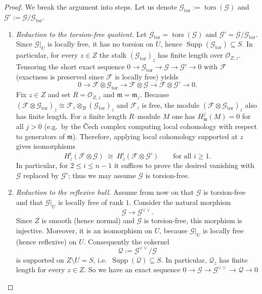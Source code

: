 \documentclass[12pt,twoside,]{amsart}
\theoremstyle{plain}
\theoremstyle{definition}
\begin{document}
\begin{proof}
We break the argument into steps. Let us denote $\mathcal G_{\operatorname{tor}}:=\operatorname{tors}(\mathcal G)$ and
$\mathcal G':=\mathcal G/\mathcal G_{\operatorname{tor}}$.

\begin{enumerate}
\item\emph{Reduction to the torsion-free quotient.}
Let $\mathcal G_{\operatorname{tor}}=\operatorname{tors}(\mathcal G)$ and $\mathcal G'=\mathcal G/\mathcal G_{\operatorname{tor}}$.
Since $\mathcal G|_U$ is locally free, it has no torsion on $U$, hence
$\operatorname{Supp}(\mathcal G_{\operatorname{tor}})\subseteq S$. In particular, for every $z\in Z$ the stalk
$(\mathcal G_{\operatorname{tor}})_z$ has finite length over $\mathcal O_{Z,z}$.
Tensoring the short exact sequence
$0\to \mathcal G_{\operatorname{tor}}\to \mathcal G\to \mathcal G'\to 0$
with $\mathcal F$ (exactness is preserved since $\mathcal F$ is locally free) yields
\[
0\to \mathcal F\otimes \mathcal G_{\operatorname{tor}}
\to \mathcal F\otimes \mathcal G
\to \mathcal F\otimes \mathcal G' \to 0.
\]
Fix $z\in Z$ and set $R=\mathcal O_{Z,z}$ and $\mathfrak m=\mathfrak m_z$.
Because $(\mathcal F\otimes \mathcal G_{\operatorname{tor}})_z\cong \mathcal F_z\otimes_R (\mathcal G_{\operatorname{tor}})_z$ and $\mathcal F_z$ is
free, the module $(\mathcal F\otimes \mathcal G_{\operatorname{tor}})_z$ also has finite length.
For a finite length $R$--module $M$ one has $H^j_{\mathfrak m}(M)=0$ for all $j>0$
(e.g.\ by the \v{C}ech complex computing local cohomology with respect to generators of $\mathfrak m$).
Therefore, applying local cohomology supported at $z$ gives isomorphisms
\[
H^i_z(\mathcal F\otimes \mathcal G)\ \cong\ H^i_z(\mathcal F\otimes \mathcal G')
\qquad\text{for all } i\ge 1.
\]
In particular, for $2\le i\le n-1$ it suffices to prove the desired vanishing with
$\mathcal G$ replaced by $\mathcal G'$; thus we may assume $\mathcal G$ is torsion-free.

\item\emph{Reduction to the reflexive hull.}
Assume from now on that $\mathcal G$ is torsion-free and that $\mathcal G|_U$ is
locally free of rank $1$.
Consider the natural morphism
\[
\mathcal G \longrightarrow \mathcal G^{\vee\vee}.
\]
Since $Z$ is smooth (hence normal) and $\mathcal G$ is torsion-free, this morphism is
injective. Moreover, it is an isomorphism on $U$, because $\mathcal G|_U$ is locally
free (hence reflexive) on $U$. Consequently the cokernel
\[
\mathcal Q:=\mathcal G^{\vee\vee}/\mathcal G
\]
is supported on $Z\setminus U=S$, i.e.\ $\operatorname{Supp}(\mathcal Q)\subseteq S$.
In particular, $\mathcal Q_z$ has finite length for every $z\in Z$.
So we have an exact sequence 
$0\to \mathcal G\to \mathcal G^{\vee\vee} \to \mathcal Q\to 0$


\end{enumerate}
\end{proof}
\end{document}

